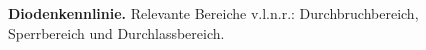 {%


\begin{figure}[H]
    \centering
    
    \caption{\textbf{Diodenkennlinie.} Relevante Bereiche v.l.n.r.: Durchbruchbereich, Sperrbereich und Durchlassbereich.}  
    \label{fig:Diodenkennlinie}
\end{figure}
}
